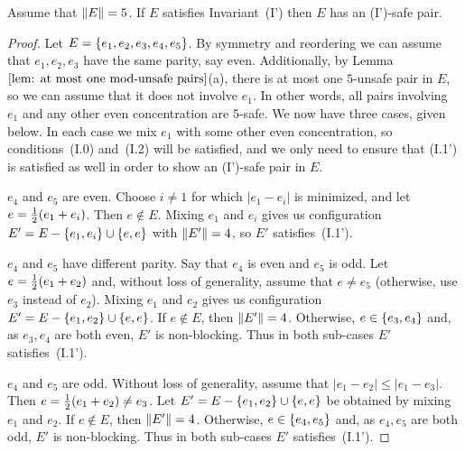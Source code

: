 
\begin{lemma}%
	\label{lem: m = 5, preserves invariant, n = 5}
	Assume that ${\|E\|}=5$.
	If $E$ satisfies Invariant~(I') then $E$ has an (I')-safe pair.
\end{lemma}%

\begin{proof}
Let $E = { \left\{ e_1, e_2,e_3,e_4,e_5 \right\} }$.
By symmetry and reordering we can assume that $e_1,e_2,e_3$ have the same parity, say even.
Additionally, by Lemma~$\ref{lem: at most one mod-unsafe pairs}$(a), there is at most one
$5$-unsafe pair in $E$, so we can assume that it does not involve $e_1$.
In other words, all pairs involving $e_1$ and any other even concentration are $5$-safe.  
We now have three cases, given below. In each case we mix $e_1$ with some other even concentration,
so conditions~(I.0) and~(I.2) will be satisfied, and we only need to ensure that
(I.1') is satisfied as well in order to show an (I')-safe pair in $E$.

\smallskip\noindent
{} $e_4$ and $e_5$ are even.
Choose $i\neq 1$ for which $|e_1 - e_i|$ is minimized, and let
$e = {\textstyle\frac{1}{2}} (e_1 + e_i)$. Then $e\notin E$.
Mixing $e_1$ and $e_i$ gives us configuration $E' = E - { \left\{ e_1,e_i \right\} }\cup { \left\{ e,e \right\} }$
with  ${\|E'\|}=4$, so $E'$ satisfies~(I.1').

\smallskip\noindent
{} $e_4$ and $e_5$ have different parity. Say that $e_4$ is even and $e_5$ is odd.
Let $e ={\textstyle\frac{1}{2}} (e_1 + e_2)$ and, without loss of generality, 
assume that $e\neq e_5$ (otherwise, use $e_3$ instead of $e_2$).  
Mixing $e_1$ and $e_2$ gives us configuration $E' = E - { \left\{ e_1,e_2 \right\} }\cup { \left\{ e,e \right\} }$.
If $e\notin E$, then ${\|E'\|}=4$.
Otherwise, $e\in{ \left\{ e_3,e_4 \right\} }$ and, as $e_3,e_4$ are both even, $E'$ is non-blocking.
Thus in both sub-cases $E'$ satisfies~(I.1').

\smallskip\noindent
{} $e_4$ and $e_5$ are odd.
Without loss of generality, assume that $|e_1 - e_2|\le |e_1-e_3|$.
Then $e ={\textstyle\frac{1}{2}} (e_1 + e_2) \neq e_3$. Let $E'= E - { \left\{ e_1,e_2 \right\} }\cup { \left\{ e,e \right\} }$ be obtained by mixing $e_1$ and $e_2$.
If $e\notin E$, then ${\|E'\|}=4$.
Otherwise, $e\in { \left\{ e_4,e_5 \right\} }$ and, as $e_4,e_5$ are both odd, $E'$ is non-blocking. 
Thus in both sub-cases $E'$ satisfies~(I.1').   
\end{proof}



